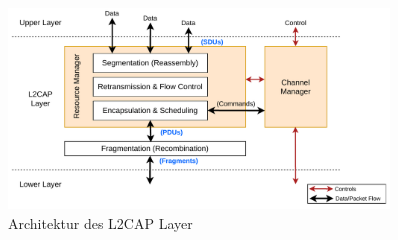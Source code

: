 \begin{figure}[H]
    \centering
    \includegraphics[width=0.9\textwidth]{graphics/l2cap_architektur.pdf}
    \caption[Architektur des L2CAP Layer]{Architektur des L2CAP Layer \cite{BtSpec4.0_1391}}
    \label{fig: l2cap architektur}
\end{figure}

